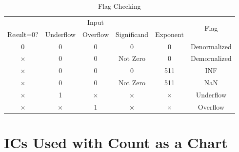 \documentclass[a4paper,12pt]{article}
\begin{document}
\begin{table}[H]
    \centering
    \begin{tabular}{|ccccc|c|}
        \hline
        \multicolumn{5}{|c|}{Input}     & \multirow{2}{*}{Flag}                                                                                                                                                 \\ \cline{1-5}
        \multicolumn{1}{|l|}{Result=0?} & \multicolumn{1}{l|}{Underflow} & \multicolumn{1}{l|}{Overflow} & \multicolumn{1}{l|}{Significand} & \multicolumn{1}{l|}{Exponent} &                                   \\ \hline
        \multicolumn{1}{|c|}{0}         & \multicolumn{1}{c|}{0}         & \multicolumn{1}{c|}{0}        & \multicolumn{1}{c|}{0}           & 0                             & \multicolumn{1}{l|}{Denormalized} \\ \hline
        \multicolumn{1}{|c|}{$\times$}  & \multicolumn{1}{c|}{0}         & \multicolumn{1}{c|}{0}        & \multicolumn{1}{c|}{Not Zero}    & 0                             & \multicolumn{1}{l|}{Demornalized} \\ \hline
        \multicolumn{1}{|c|}{$\times$}  & \multicolumn{1}{c|}{0}         & \multicolumn{1}{c|}{0}        & \multicolumn{1}{c|}{0}           & 511                           & INF                               \\ \hline
        \multicolumn{1}{|c|}{$\times$}  & \multicolumn{1}{c|}{0}         & \multicolumn{1}{c|}{0}        & \multicolumn{1}{c|}{Not Zero}    & 511                           & NaN                               \\ \hline
        \multicolumn{1}{|c|}{$\times$}  & \multicolumn{1}{c|}{1}         & \multicolumn{1}{c|}{$\times$} & \multicolumn{1}{c|}{$\times$}    & $\times$                      & Underflow                         \\ \hline
        \multicolumn{1}{|c|}{$\times$}  & \multicolumn{1}{c|}{$\times$}  & \multicolumn{1}{c|}{1}        & \multicolumn{1}{c|}{$\times$}    & $\times$                      & Overflow                          \\ \hline
    \end{tabular}
    \caption{Flag Checking}
\end{table}

\section{ICs Used with Count as a Chart}
\end{document}
